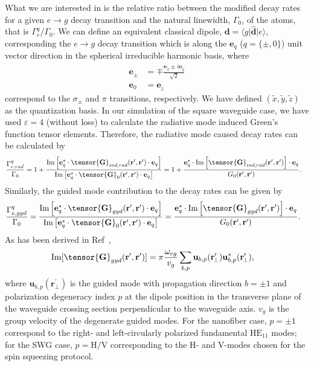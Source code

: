 \documentclass[preprint,aps,pra,onecolumn,superscriptaddress]{revtex4-1} %
\def\br{\mathbf{r}}
\def\bra#1{\langle{#1}\rvert}%
\def\ket#1{\lvert{#1}\rangle}%
\begin{document}
\begin{appendix}
    
What we are interested in is the relative ratio between the modified decay rates for a given $e\rightarrow g$ decay transition and the natural linewidth, $ \Gamma_0 $, of the atoms, that is $ \Gamma_e^q/\Gamma_0 $. 
We can define an equivalent classical dipole, $ \mathbf{d}=\bra{g}\hat{\mathbf{d}}\ket{e} $, corresponding the $ e\rightarrow g $ decay transition which is along the $ \mathbf{e}_q $ ($q=\{\pm,0\}$) unit vector direction in the spherical irreducible harmonic basis, where
\begin{align}
    \mathbf{e}_\pm &=\mp \frac{\mathbf{e}_{\tilde{x}}\pm i\mathbf{e}_{\tilde{y}}}{\sqrt{2}}\\
    \mathbf{e}_0 &=\mathbf{e}_{\tilde{z}}
\end{align}
correspond to the $\sigma_\pm$ and $\pi$ transitions, respectively.
We have defined $ (\tilde{x},\tilde{y},\tilde{z}) $ as the quantization basis.
In our simulation of the square waveguide case, we have used $\varepsilon=4$ (without loss) to calculate the radiative mode induced Green's function tensor elements.
Therefore, the radiative mode caused decay rates can be calculated by
\begin{align}
\frac{\Gamma_{e,rad}^{q}}{\Gamma_0} &= 1+ \frac{\mathrm{Im}\left[\mathbf{e}_q^*\cdot \tensor{\mathbf{G}}_{ind,rad}(\mathbf{r}',\mathbf{r}')\cdot \mathbf{e}_q\right]}{ \mathrm{Im}\left[\mathbf{e}_q^*\cdot \tensor{\mathbf{G}}_0(\mathbf{r}',\mathbf{r}')\cdot \mathbf{e}_q\right]}
=1+ \frac{\mathbf{e}_q^*\cdot \mathrm{Im}\left[\tensor{\mathbf{G}}_{ind,rad}(\mathbf{r}',\mathbf{r}')\right]\cdot \mathbf{e}_q}{G_0(\mathbf{r}',\mathbf{r}')}.
\end{align}
Similarly, the guided mode contribution to the decay rates can be given by
\begin{align}
\frac{\Gamma_{e,gyd}^{q}}{\Gamma_0} &= \frac{\mathrm{Im}\left[\mathbf{e}_q^*\cdot \tensor{\mathbf{G}}_{gyd}(\mathbf{r}',\mathbf{r}')\cdot \mathbf{e}_q\right]}{ \mathrm{Im}\left[\mathbf{e}_q^*\cdot \tensor{\mathbf{G}}_0(\mathbf{r}',\mathbf{r}')\cdot \mathbf{e}_q\right]}
= \frac{\mathbf{e}_q^*\cdot \mathrm{Im}\left[ \tensor{\mathbf{G}}_{gyd}(\mathbf{r}',\mathbf{r}')\right]\cdot \mathbf{e}_q}{ G_0(\mathbf{r}',\mathbf{r}')}.
\end{align}
As has been derived in Ref~\cite{Qi2016},
\begin{align}
\mathrm{Im}[\tensor{\mathbf{G}}_{gyd}(\br',\br')] &= \pi \frac{\omega_{eg}}{v_g } \sum_{b, p} 
		\mathbf{u}_{b, p} (\br_{\!\perp}^\prime)\mathbf{u}^*_{b , p} (\br_{\!\perp}^\prime),
\end{align}
where $\mathbf{u}_{b, p} (\br_{\!\perp}^\prime)$ is the guided mode with propagation direction $ b=\pm 1 $ and polarization degeneracy index $ p $ at the dipole position in the transverse plane of the waveguide crossing section perpendicular to the waveguide axis.
$v_g$ is the group velocity of the degenerate guided modes.
For the nanofiber case, $ p=\pm 1 $ correspond to the right- and left-circularly polarized fundamental $\mathrm{HE}_{11}$ modes; 
for the SWG case, $ p=\mathrm{H}/\mathrm{V} $ corresponding to the H- and V-modes chosen for the spin squeezing protocol.


\end{appendix}
\end{document}
